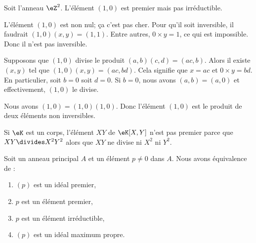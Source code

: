 \begin{example}     \label{EXooEIUEooCZCPMC}
    Soit l'anneau \( \eZ^2\). L'élément \( (1,0)\) est premier mais pas irréductible.
    \begin{subproof}
        \item[\( (1,0)\) est premier]
            L'élément \( (1,0)\) est non nul; ça c'est pas cher. Pour qu'il soit inversible, il faudrait \( (1,0)(x,y)=(1,1)\). Entre autres, \( 0\times y=1\), ce qui est impossible. Donc il n'est pas inversible.

            Supposons que \( (1,0)\) divise le produit \( (a,b)(c,d)=(ac,b)\). Alors il existe \( (x,y)\) tel que \( (1,0)(x,y)=(ac,bd)\). Cela signifie que \( x=ac\) et \( 0\times y=bd\). En particulier, soit \( b=0\) soit \( d=0\). Si \( b=0\), nous avons \( (a,b)=(a,0)\) et effectivement, \( (1,0)\) le divise.
        \item[\( (1,0)\) n'est pas irréductible]
            Nous avons \( (1,0)=(1,0)(1,0)\). Donc l'élément \( (1,0)\) est le produit de deux éléments non inversibles.
    \end{subproof}
\end{example}

\begin{example}
    Si \( \eK\) est un corps, l'élément \( XY\) de \( \eK[X,Y]\) n'est pas premier parce que \( XY\divides X^2Y^2\) alors que \( XY\) ne divise ni \( X^2\) ni \( Y^2\).
\end{example}


\begin{proposition}     \label{PROPooZICGooNmblhl}
    Soit un anneau principal \( A\) et un élément \( p\neq 0\) dans \( A\). Nous avons équivalence de :
    \begin{enumerate}
        \item   \label{ITEMooBTEAooWlFUTX}
            \( (p)\) est un idéal premier,
        \item   \label{ITEMooKQRMooBNPDMX}
            \( p\) est un élément premier,
        \item   \label{ITEMooZYYJooCWiBhL}
            \( p\) est un élément irréductible,
        \item   \label{ITEMooHPAIooYoQzqD}
            \( (p)\) est un idéal maximum propre.
    \end{enumerate}
\end{proposition}

